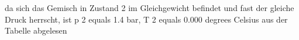 da sich das Gemisch in Zustand 2 im Gleichgewicht befindet und fast der gleiche Druck herrscht, ist p 2 equals 1.4 bar, T 2 equals 0.000 degrees Celsius aus der Tabelle abgelesen